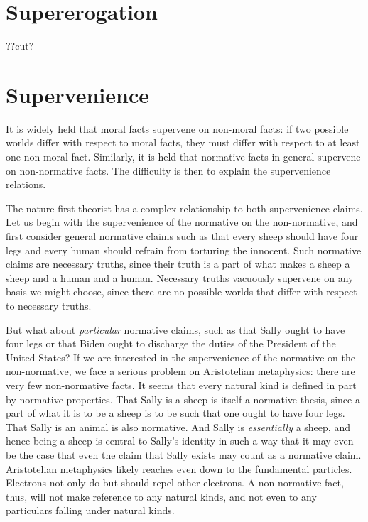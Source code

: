 \section{Supererogation}
??cut?

\section{Supervenience}
It is widely held that moral facts supervene on non-moral facts: if two possible worlds differ
with respect to moral facts, they must differ with respect to at least one non-moral fact. Similarly,
it is held that normative facts in general supervene on non-normative facts. The difficulty is then
to explain the supervenience relations.

The nature-first theorist has a complex relationship to both supervenience claims. Let us begin
with the supervenience of the normative on the non-normative, and first consider
general normative claims such as that every sheep should have four legs and every human should refrain
from torturing the innocent. Such normative claims are necessary truths, since their truth is a part of
what makes a sheep a sheep and a human and a human. Necessary truths vacuously supervene on any basis
we might choose, since there are no possible worlds that differ with respect to necessary truths.

But what about \textit{particular} normative claims, such as that Sally ought to have four legs
or that Biden ought to discharge the duties of the President of the United States? If we are
interested in the supervenience of the normative on the non-normative, we face a serious problem on
Aristotelian metaphysics: there are very few non-normative facts. It seems that every natural kind
is defined in part by normative properties. That Sally is a sheep is itself a normative thesis,
since a part of what it is to be a sheep is to be such that one ought to have four legs. That Sally
is an animal is also normative. And Sally is \textit{essentially} a sheep, and hence being a sheep
is central to Sally's identity in such a way that it may even be the case that even the claim that
Sally exists may count as a normative claim. Aristotelian metaphysics likely reaches even down to the fundamental
particles. Electrons not only do but should repel other electrons. A non-normative fact, thus, will
not make reference to any natural kinds, and not even to any particulars falling under natural
kinds.

